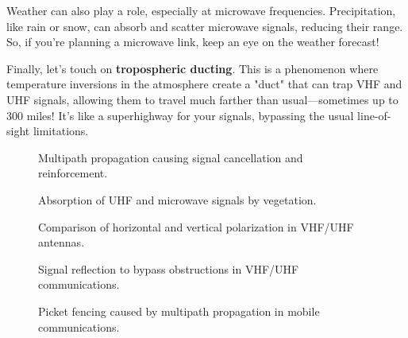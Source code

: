 Weather can also play a role, especially at microwave frequencies. Precipitation, like rain or snow, can absorb and scatter microwave signals, reducing their range. So, if you're planning a microwave link, keep an eye on the weather forecast!

Finally, let's touch on \textbf{tropospheric ducting}. This is a phenomenon where temperature inversions in the atmosphere create a "duct" that can trap VHF and UHF signals, allowing them to travel much farther than usual—sometimes up to 300 miles! It's like a superhighway for your signals, bypassing the usual line-of-sight limitations.

\begin{figure}[h]
    \centering
    \caption{Multipath propagation causing signal cancellation and reinforcement.}
    \label{fig:multipath-propagation}
\end{figure}

\begin{figure}[h]
    \centering
    \caption{Absorption of UHF and microwave signals by vegetation.}
    \label{fig:vegetation-absorption}
\end{figure}

\begin{figure}[h]
    \centering
    \caption{Comparison of horizontal and vertical polarization in VHF/UHF antennas.}
    \label{fig:antenna-polarization}
\end{figure}

\begin{figure}[h]
    \centering
    \caption{Signal reflection to bypass obstructions in VHF/UHF communications.}
    \label{fig:signal-reflection}
\end{figure}

\begin{figure}[h]
    \centering
    \caption{Picket fencing caused by multipath propagation in mobile communications.}
    \label{fig:picket-fencing}
\end{figure}

